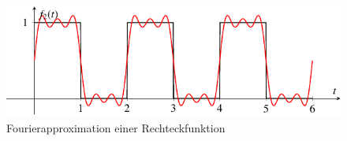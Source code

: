 %
%
%
\begin{figure}
	\centering
	\includegraphics{papers/fourier/images/fourier_Rechteck.pdf}
	\caption{Fourierapproximation einer Rechteckfunktion}
	\label{fourier:fig:fourierrechteck}
\end{figure}